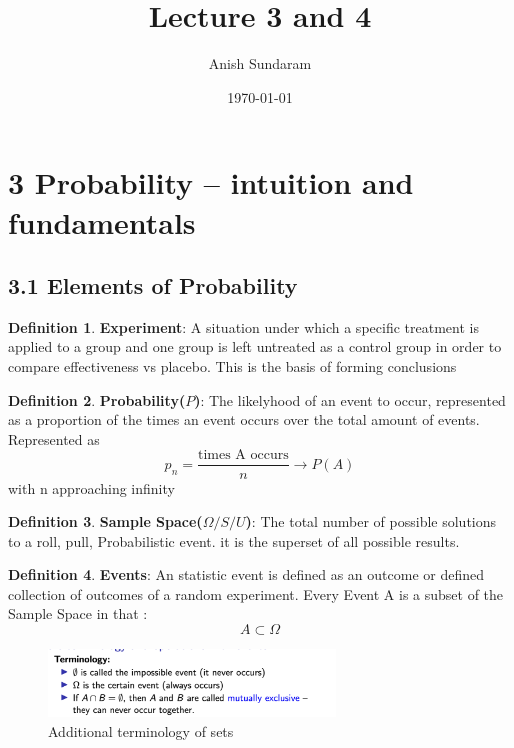 \documentclass[12pt]{amsart}
\title{Lecture 3 and 4}
\author{Anish Sundaram}
\date{\today}
\theoremstyle{definition}
\newtheorem{definition}{Definition} %
\numberwithin{equation}{theorem}    %
\begin{document}
\maketitle

\tableofcontents

\section*{3 Probability – intuition and fundamentals}
\subsection*{3.1 Elements of Probability}

\begin{definition}
    \textbf{Experiment}:
    A situation under which a specific treatment is applied to a group and one group is left untreated as a control group in order to compare effectiveness vs placebo. This is the basis of forming conclusions
\end{definition}

\begin{definition}
    \textbf{Probability($P$)}:
    The likelyhood of an event to occur, represented as a proportion of the times an event occurs over the total amount of events. Represented as 
    $$p_n = \frac{\text{times A occurs}}{n} \longrightarrow P(A)$$ with n approaching infinity
\end{definition}

\begin{definition}
    \textbf{Sample Space($\Omega/S/U$)}:
    The total number of possible solutions to a roll, pull, Probabilistic event. it is the superset of all possible results.
\end{definition}


\begin{definition}
    \textbf{Events}:
    An statistic event is defined as an outcome or defined collection of outcomes of a random experiment. Every Event A is a subset of the Sample Space in that : $$A \subset \Omega$$
\end{definition}

\begin{figure}[H]
    \centering
    \includegraphics[width=3in]{Media/terminology.png}
    \caption{Additional terminology of sets}
    \label{terminology}
\end{figure}
\end{document}
